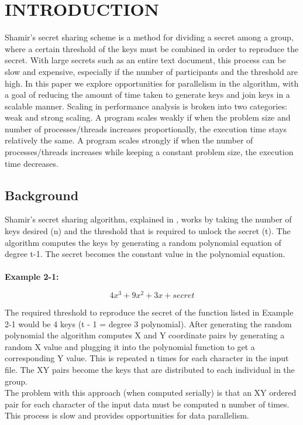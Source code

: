\documentclass[main.tex]{subfiles}
\begin{document}
\section{INTRODUCTION} \label{sec2}

\indent Shamir's secret sharing scheme is a method for dividing a secret among a group, where a certain threshold of the keys must be combined in order to reproduce the secret.  With large secrets such as an entire text document, this process can be slow and expensive, especially if the number of participants and the threshold are high. In this paper we explore opportunities for parallelism in the algorithm, with a goal of reducing the amount of time taken to generate keys and join keys in a scalable manner. Scaling in performance analysis is broken into two categories: weak and strong scaling. A program scales weakly if when the problem size and number of processes/threads increases proportionally, the execution time stays relatively the same. A program scales strongly if when the number of processes/threads increases while keeping a constant problem size, the execution time decreases.

\subsection{Background}

\indent Shamir's secret sharing algorithm, explained in \cite{three}, works by taking the number of keys desired (n) and the threshold that is required to unlock the secret (t).  The algorithm computes the keys by generating a random polynomial equation of degree t-1.  The secret becomes the constant value in the polynomial equation.\\ \\

\textbf{Example 2-1:}

\[ 4x^3 +  9x^2 + 3x + secret\]

\indent The required threshold to reproduce the secret of the function listed in Example 2-1 would be 4 keys (t - 1 = degree 3 polynomial). After generating the random polynomial the algorithm computes X and Y coordinate pairs by generating a random X value and plugging it into the polynomial function to get a corresponding Y value.  This is repeated n times for each character in the input file.  The XY pairs become the keys that are distributed to each individual in the group. \\
\indent The problem with this approach (when computed serially) is that an XY ordered pair for each character of the input data must be computed n number of times. This process is slow and provides opportunities for data parallelism.
\end{document}
